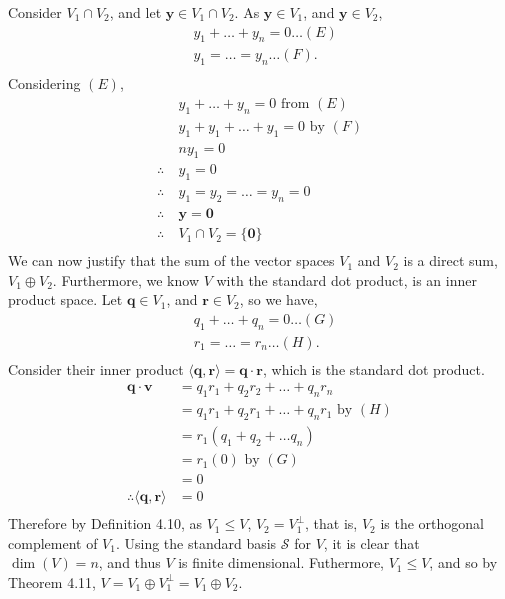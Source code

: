 \documentclass[a4paper,11pt]{article}
\newcommand{\ds}{\displaystyle}
\begin{document}
\pagebreak

Consider $\ds{V_1 \cap V_2}$, and let $\ds{\mathbf{y} \in V_1 \cap V_2}$. As $\ds{\mathbf{y} \in V_1}$, and $\ds{\mathbf{y} \in V_2}$, 
	\begin{align*}
		& y_1 + \dots + y_n = 0 \dots (E)\\
		& y_1 = \dots = y_n \dots (F).\\
	\end{align*}
Considering $\ds{(E)}$, 
	\begin{align*}
		& y_1 + \dots + y_n = 0 \text{ from } (E)\\
		& y_1 + y_1 + \dots + y_1 = 0 \text{ by } (F)\\
		& ny_1 = 0\\
		\therefore \: & y_1 = 0\\
		\therefore \: & y_1 = y_2 = \dots = y_n = 0\\
		\therefore \: & \mathbf{y} = \mathbf{0}\\
		\therefore \: & V_1 \cap V_2 = \{\mathbf{0}\}\\
	\end{align*}
We can now justify that the sum of the vector spaces $\ds{V_1}$ and $\ds{V_2}$ is a direct sum, $\ds{V_1 \oplus V_2}$. Furthermore, we know $\ds{V}$ with the standard dot product, is an inner product space. Let $\ds{\mathbf{q} \in V_1}$, and $\ds{\mathbf{r} \in V_2}$, so we have, 
	\begin{align*}
		& q_1 + \dots + q_n = 0 \dots (G)\\
		& r_1 = \dots = r_n \dots (H).\\
	\end{align*}
Consider their inner product $\ds{\langle \mathbf{q},\mathbf{r} \rangle = \mathbf{q}\cdot\mathbf{r}}$, which is the standard dot product.
	\begin{align*}
		\mathbf{q}\cdot\mathbf{v} & = q_1r_1 + q_2r_2 + \dots + q_nr_n\\
								  & = q_1r_1 + q_2r_1 + \dots + q_nr_1 \text{ by } (H)\\
								  & = r_1(q_1 + q_2 + \dots q_n)\\
								  & = r_1(0) \text{ by } (G)\\
								  & = 0\\
		\therefore \langle \mathbf{q}, \mathbf{r} \rangle & = 0\\ 
	\end{align*}
Therefore by Definition 4.10, as $\ds{V_1 \leq V}$, $\ds{V_2 = V_1^{\bot}}$, that is, $\ds{V_2}$ is the orthogonal complement of $\ds{V_1}$. Using the standard basis $\ds{\mathcal{S}}$ for $\ds{V}$, it is clear that $\ds{\dim(V) = n}$, and thus $\ds{V}$ is finite dimensional. Futhermore, $\ds{V_1 \leq V}$, and so by Theorem 4.11, $\ds{V = V_1 \oplus V_1^{\bot} = V_1 \oplus V_2}$.
\end{document}
